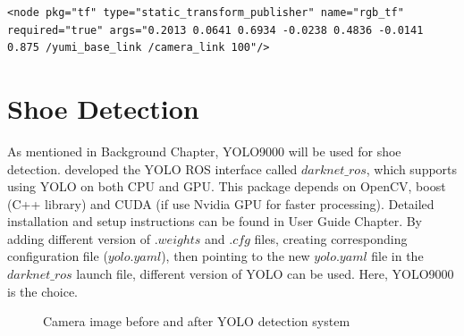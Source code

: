 \begin{verbatim}
<node pkg="tf" type="static_transform_publisher" name="rgb_tf" required="true" args="0.2013 0.0641 0.6934 -0.0238 0.4836 -0.0141 0.875 /yumi_base_link /camera_link 100"/>
\end{verbatim}

\section{Shoe Detection} \label{shoedetection}
As mentioned in Background Chapter, YOLO9000 will be used for shoe detection. \citep{bjelonicYolo2018} developed the YOLO ROS interface called $darknet\_ros$, which supports using YOLO on both CPU and GPU. This package depends on OpenCV, boost (C++ library) and CUDA (if use Nvidia GPU for faster processing). Detailed installation and setup instructions can be found in User Guide Chapter. By adding different version of $.weights$ and $.cfg$ files, creating corresponding configuration file ($yolo.yaml$), then pointing to the new $yolo.yaml$ file in the $darknet\_ros$ launch file, different version of YOLO can be used. Here, YOLO9000 is the choice.

\begin{figure}[H]
\centering
{}
\caption{Camera image before and after YOLO detection system}
\label{5.2}
\end{figure}

